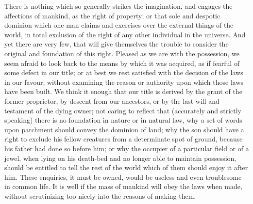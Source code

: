 
There is nothing which so generally strikes the imagination, and engages the
affections of mankind, as the right of property; or that sole and despotic
dominion which one man claims and exercises over the external things of the
world, in total exclusion of the right of any other individual in the universe.
And yet there are very few, that will give themselves the trouble to consider
the original and foundation of this right. Pleased as we are with the
possession, we seem afraid to look back to the means by which it was acquired,
as if fearful of some defect in our title; or at best we rest satisfied with the
decision of the laws in our favour, without examining the reason or authority
upon which those laws have been built. We think it enough that our title is
derived by the grant of the former proprietor, by descent from our ancestors, or
by the last will and testament of the dying owner; not caring to reflect that
(accurately and strictly speaking) there is no foundation in nature or in
natural law, why a set of words upon parchment should convey the dominion of
land; why the son should have a right to exclude his fellow creatures from a
determinate spot of ground, because his father had done so before him; or why
the occupier of a particular field or of a jewel, when lying on his death-bed
and no longer able to maintain possession, should be entitled to tell the rest
of the world which of them should enjoy it after him. These enquiries, it must
be owned, would be useless and even troublesome in common life. It is well if
the mass of mankind will obey the laws when made, without scrutinizing too
nicely into the reasons of making them.

